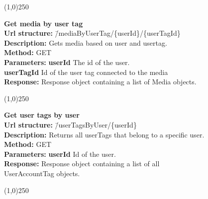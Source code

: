\documentclass[11pt]{article}
\begin{document}
\begin{center}\line(1,0){250}\end{center}

\begin{tabbing}
\textbf{Get media by user tag} \\
\textcolor{black!60}{\textbf{Url structure:}} \hspace{0.2in} \= /mediaByUserTag/\{userId\}/\{userTagId\} \\
\textcolor{black!60}{\textbf{Description:}}  \> Gets media based on user and usertag. \\
\textcolor{black!60}{\textbf{Method:}} \> GET \\
\textcolor{black!60}{\textbf{Parameters:}} \> \textbf{userId} The id of the user. \\
\> \textbf{userTagId} Id of the user tag connected to the media \\
\textcolor{black!60}{\textbf{Response:}} \> Response object containing a list of Media objects.
\end{tabbing}

\begin{center}\line(1,0){250}\end{center}

\begin{tabbing}
\textbf{Get user tags by user} \\
\textcolor{black!60}{\textbf{Url structure:}} \hspace{0.2in} \= /userTagsByUser/\{userId\} \\
\textcolor{black!60}{\textbf{Description:}}  \> Returns all userTags that belong to a specific user. \\
\textcolor{black!60}{\textbf{Method:}} \> GET \\
\textcolor{black!60}{\textbf{Parameters:}} \> \textbf{userId} Id of the user. \\
\textcolor{black!60}{\textbf{Response:}} \> Response object containing a list of all 
\\ \> UserAccountTag objects.
\end{tabbing}

\begin{center}\line(1,0){250}\end{center}
\end{document}
